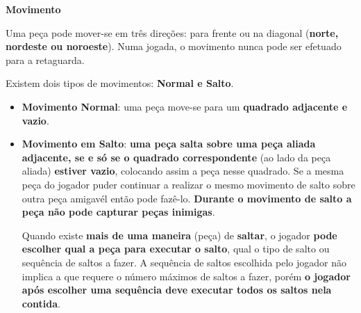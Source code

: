 \documentclass[a4paper]{article}
\begin{document}
\large{\textbf{Movimento}}
\begin{small}

Uma peça pode mover-se em três direções: para frente ou na diagonal (\textbf{norte, nordeste ou noroeste}). Numa jogada, o movimento nunca pode ser efetuado para a retaguarda. 

Existem dois tipos de movimentos: \textbf{Normal e Salto}. 
\begin{itemize}
\item \textbf{Movimento Normal}:
uma peça move-se para um \textbf{quadrado adjacente e vazio}. 
\item \textbf{Movimento em Salto}:
\textbf{uma peça salta sobre uma peça aliada adjacente, se e só se o quadrado correspondente} (ao lado da peça aliada) \textbf{estiver vazio}, colocando assim a peça nesse quadrado. Se a mesma peça do jogador puder continuar a realizar o mesmo movimento de salto sobre outra peça amigavél então pode fazê-lo. \textbf{Durante o movimento de salto a peça não pode capturar peças inimigas}.

Quando existe \textbf{mais de uma maneira} (peça) de \textbf{saltar}, o jogador \textbf{pode escolher qual a peça para executar o salto}, qual o tipo de salto ou sequência de saltos a fazer. A sequência de saltos escolhida pelo jogador não implica a que requere o número máximos de saltos a fazer, porém \textbf{o jogador após escolher uma sequência deve executar todos os saltos nela contida}.
\end{itemize}
\end{small}\pagebreak
\end{document}
